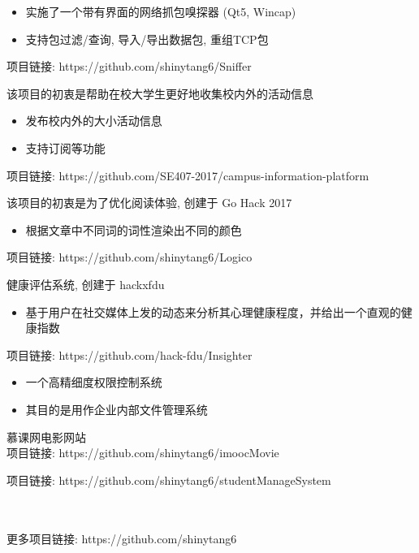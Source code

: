 \documentclass{resume}
\begin{document}
\begin{itemize}
  \item 实施了一个带有界面的网络抓包嗅探器 (Qt5, Wincap)
  \item 支持包过滤/查询, 导入/导出数据包, 重组TCP包
\end{itemize}
项目链接: https://github.com/shinytang6/Sniffer


该项目的初衷是帮助在校大学生更好地收集校内外的活动信息
\begin{itemize}
  \item 发布校内外的大小活动信息
  \item 支持订阅等功能
\end{itemize}
项目链接: https://github.com/SE407-2017/campus-information-platform

该项目的初衷是为了优化阅读体验, 创建于 Go Hack 2017
\begin{itemize}
  \item 根据文章中不同词的词性渲染出不同的颜色
\end{itemize}
项目链接: https://github.com/shinytang6/Logico


健康评估系统, 创建于 hackxfdu
\begin{itemize}
  \item 基于用户在社交媒体上发的动态来分析其心理健康程度，并给出一个直观的健康指数
\end{itemize}
项目链接: https://github.com/hack-fdu/Insighter

\begin{itemize}
  \item 一个高精细度权限控制系统
  \item 其目的是用作企业内部文件管理系统
\end{itemize}

慕课网电影网站\\
项目链接: https://github.com/shinytang6/imoocMovie

项目链接: https://github.com/shinytang6/studentManageSystem

\\
\\
更多项目链接: https://github.com/shinytang6
\end{document}
